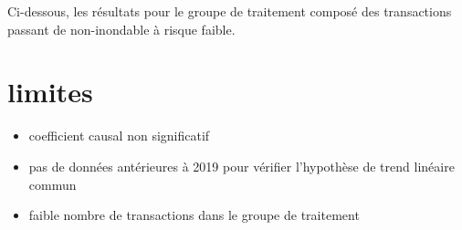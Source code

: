 \documentclass[a4paper,12pt]{article}
\begin{document}

\newline
Ci-dessous, les résultats pour le groupe de traitement composé des transactions passant de non-inondable à risque faible. \newline




\section{limites}
\begin{itemize}
\item coefficient causal non significatif
\item pas de données antérieures à 2019 pour vérifier l'hypothèse de trend linéaire commun
\item faible nombre de transactions dans le groupe de traitement
\end{itemize}
\end{document}
